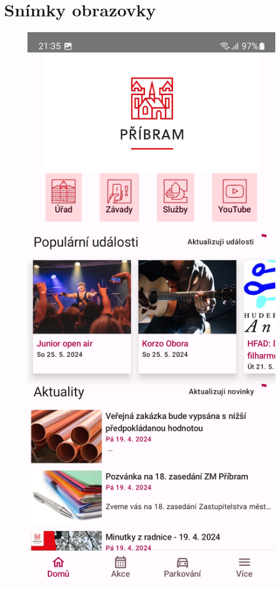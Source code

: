 \chapter{Snímky obrazovky}

\begin{figure}[H]
    \includegraphics[width=\linewidth]{screens/1.jpg}

\end{figure}
